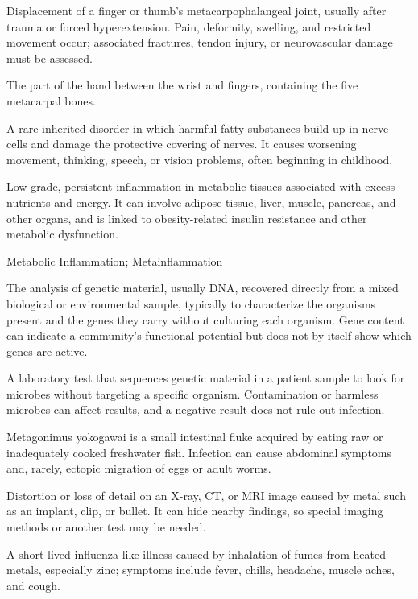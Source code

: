  Displacement of a finger or thumb's metacarpophalangeal joint, usually after trauma or forced hyperextension. Pain, deformity, swelling, and restricted movement occur; associated fractures, tendon injury, or neurovascular damage must be assessed.

 The part of the hand between the wrist and fingers, containing the five metacarpal bones.

 A rare inherited disorder in which harmful fatty substances build up in nerve cells and damage the protective covering of nerves. It causes worsening movement, thinking, speech, or vision problems, often beginning in childhood.

 Low-grade, persistent inflammation in metabolic tissues associated with excess nutrients and energy. It can involve adipose tissue, liver, muscle, pancreas, and other organs, and is linked to obesity-related insulin resistance and other metabolic dysfunction.

\synonyms
Metabolic Inflammation; Metainflammation

 The analysis of genetic material, usually DNA, recovered directly from a mixed biological or environmental sample, typically to characterize the organisms present and the genes they carry without culturing each organism. Gene content can indicate a community’s functional potential but does not by itself show which genes are active.

 A laboratory test that sequences genetic material in a patient sample to look for microbes without targeting a specific organism. Contamination or harmless microbes can affect results, and a negative result does not rule out infection.

 Metagonimus yokogawai is a small intestinal fluke acquired by eating raw or inadequately cooked freshwater fish. Infection can cause abdominal symptoms and, rarely, ectopic migration of eggs or adult worms.

 Distortion or loss of detail on an X-ray, CT, or MRI image caused by metal such as an implant, clip, or bullet. It can hide nearby findings, so special imaging methods or another test may be needed.

 A short-lived influenza-like illness caused by inhalation of fumes from heated metals, especially zinc; symptoms include fever, chills, headache, muscle aches, and cough.

